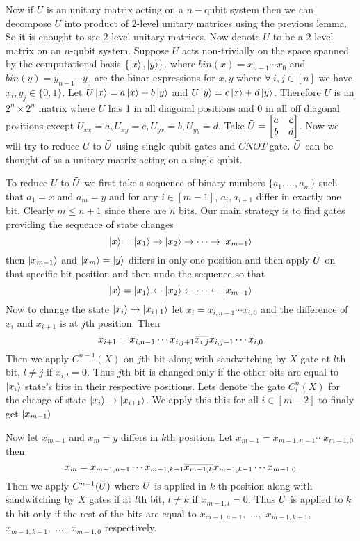 \documentclass[a4paper, 11pt]{article}
\begin{document}
{	Now if $U$ is an unitary matrix acting on a $n-$qubit system then we can decompose $U$ into product of $2$-level unitary matrices using the previous lemma. So it is enought to see 2-level unitary matrices. Now denote $U$ to be a 2-level matrix on an $n$-qubit system. Suppose $U$ acts non-trivially on the space spanned by the computational basis $\{\ket{x},\ket{y}\}$. where $bin(x)=x_{n-1}\cdots x_0$ and $bin(y)=y_{n-1}\cdots y_0$ are the binar expressions for $x,y$ where $\forall\ i,j\in [n]$ we have $x_i, y_j\in \{0,1\}$. Let $U\ket{x}=a\ket{x}+b\ket{y}$ and $U\ket{y}=c\ket{x}+d\ket{y}$. Therefore $U$ is an $2^n\times 2^n$ matrix where $U$ has 1 in all diagonal positions and 0 in all off diagonal positions except $U_{xx}=a, U_{xy}=c, U_{yx}=b, U_{yy}=d$. Take $\tilde{U}=\left[\begin{matrix}a & c\\ b & d\end{matrix}\right]$. Now we will try to reduce $U$ to $\tilde{U}$ using single qubit gates and $CNOT$ gate. $\tilde{U}$ can be thought of as a unitary matrix acting on a single qubit. 
	
	To reduce $U$ to $\tilde{U}$ we first take s sequence of binary numbers $\{ a_1,\dots , a_m\}$ such that $a_1=x$ and $a_m=y$ and for any $i\in [m-1]$, $a_i, a_{i+1}$ differ in exactly one bit. Clearly $m\leq n+1$ since there are $n$ bits. Our main strategy is to find gates providing the sequence of state changes $$\ket{x}=\ket{x_1}\to \ket{x_2}\to \cdots \to \ket{x_{m-1}}$$ then $\ket{x_{m-1}}$ and $\ket{x_m}=\ket{y}$ differs in only one position and then apply $\tilde{U}$ on that specific bit position and then undo the sequence so that $$\ket{x}=\ket{x_1}\leftarrow \ket{x_2}\leftarrow \cdots \leftarrow \ket{x_{m-1}}$$ Now to change the state $\ket{x_i}\to \ket{x_{i+1}}$ let $x_i=x_{i,n-1}\cdots x_{i,0}$ and the difference of $x_i$ and $x_{i+1}$ is at $j$th position. Then $$x_{i+1}=x_{i,n-1}\cdots x_{i,j+1}\overline{x_{i,j}}x_{i,j-1}\cdots x_{i,0}$$ Then we apply $C^{n-1}(X)$ on $j$th bit along  with sandwitching by $X$ gate at $l$th bit, $l\neq j$ if $x_{i,l}=0$. Thus $j$th bit is changed only if the other bits are equal to $\ket{x_i}$ state's bits in their respective positions. Lets denote the gate $C_i^n(X)$ for the change of state   $\ket{x_i}\to \ket{x_{i+1}}$. We apply this this for all $i\in [m-2]$ to finaly get $\ket{x_{m-1}}$
	
	Now let $x_{m-1}$ and $x_m=y$ differs in $k$th position. Let $x_{m-1}=x_{m-1,n-1}\cdots x_{m-1,0}$ then {$$x_m=x_{m-1,n-1}\cdots x_{m-1,k+1}\overline{x_{m-1,k}}x_{m-1,k-1}\cdots x_{m-1,0}$$} Then we apply $C^{n-1}(\tilde{U})$ where $\tilde{U}$ is applied in $k$-th position along with sandwitching by $X$ gates if at $l$th bit, $l\neq k$ if $x_{m-1,l}=0$. Thus $\tilde{U}$ is applied to $k$th bit only if the rest of the bits are equal to $x_{m-1,n-1},$ $\dots,$ $x_{m-1,k+1},$ $x_{m-1,k-1},$ $\dots,$ $x_{m-1,0}$ respectively. 
	
}
\end{document}
